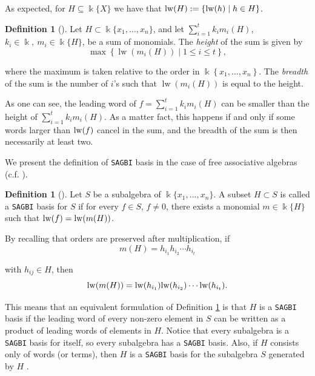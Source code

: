 \documentclass{amsart}
\theoremstyle{definition}
\newtheorem{definition}[theorem]{Definition}
\theoremstyle{remark}
\numberwithin{equation}{section}
\begin{document}
As expected, for $H \subseteq \Bbbk \{X\}$ we have that ${\rm lw}(H) := \left\{{\rm lw}(h) \mid h\in H\right\}$. 

\begin{definition}[{\cite[Definition 1]{Nordbeck1998}}]\label{Nordbeck1998Definition1}
Let $H \subset \Bbbk\{x_1, \dotsc, x_n\}$, and let $\sum\limits_{i=1}^t k_i m_i(H)$, $k_i \in \Bbbk,\ m_i \in \Bbbk\{ H\}$, be a sum of monomials. The {\em height} of the sum is given by 
$$
\max \left\{\operatorname{lw}(m_i(H)) \mid 1 \leq i \leq t\right\},
$$ 

where the maximum is taken relative to the order in $\Bbbk\left\{x_1, \ldots, x_n\right\}$. The {\em breadth} of the sum is the number of $i$'s such that $\operatorname{lw}(m_i(H))$ is equal to the height.
\end{definition}

As one can see, the leading word of $f = \sum\limits_{i=1}^t k_i m_i(H)$ can be smaller than the height of $\sum\limits_{i=1}^t k_i m_i(H)$. As a matter fact, this happens if and only if some words larger than ${\rm lw}(f)$ cancel in the sum, and the breadth of the sum is then necessarily at least two.

We present the definition of \texttt{SAGBI} basis in the case of free associative algebras (c.f. \cite[Definition 6.6.2]{KreuzerRobbiano2005}).

\begin{definition}[{\cite[Definition 2]{Nordbeck1998}}]\label{Nordbeck1998Definition2}
Let $S$ be a subalgebra of $\Bbbk\{x_1, \dotsc, x_n\}$. A subset $H\subset S$ is called a \texttt{SAGBI} basis for $S$ if for every $f\in S$, $f\neq 0$, there exists a monomial $m\in \Bbbk \{H\}$ such that ${\rm lw}(f) = {\rm lw}(m(H))$.
\end{definition}

By recalling that orders are preserved after multiplication, if 
$$
m(H) = h_{i_1} h_{i_2} \dotsb h_{i_t}
$$ 

with $h_{ij} \in H$, then 
$$
{\rm lw}(m(H)) = {\rm lw}(h_{i_1}) {\rm lw}(h_{i_2}) \dotsb {\rm lw}(h_{i_t}). 
$$

This means that an equivalent formulation of Definition \ref{Nordbeck1998Definition2} is that $H$ is a \texttt{SAGBI} basis if the leading word of every non-zero element in $S$ can be written as a product of leading words of elements in $H$. Notice that every subalgebra is a \texttt{SAGBI} basis for itself, so every subalgebra has a \texttt{SAGBI} basis. Also, if $H$ consists only of words (or terms), then $H$ is a \texttt{SAGBI} basis for the subalgebra $S$ generated by $H$ \cite[Example 2]{Nordbeck1998}.
\end{document}
